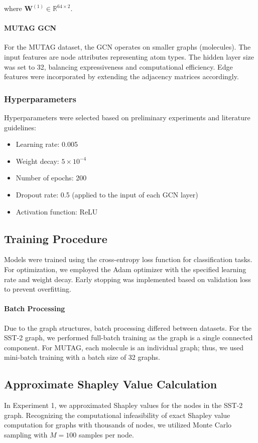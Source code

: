\documentclass{article}
\begin{document}
where $\mathbf{W}^{(1)} \in \mathbb{R}^{64 \times 2}$.

\paragraph{MUTAG GCN}
For the MUTAG dataset, the GCN operates on smaller graphs (molecules). The input features are node attributes representing atom types. The hidden layer size was set to 32, balancing expressiveness and computational efficiency. Edge features were incorporated by extending the adjacency matrices accordingly.

\subsubsection{Hyperparameters}
Hyperparameters were selected based on preliminary experiments and literature guidelines:

\begin{itemize}
    \item Learning rate: 0.005
    \item Weight decay: $5 \times 10^{-4}$
    \item Number of epochs: 200
    \item Dropout rate: 0.5 (applied to the input of each GCN layer)
    \item Activation function: ReLU
\end{itemize}

\subsection{Training Procedure}
Models were trained using the cross-entropy loss function for classification tasks. For optimization, we employed the Adam optimizer with the specified learning rate and weight decay. Early stopping was implemented based on validation loss to prevent overfitting.

\paragraph{Batch Processing}
Due to the graph structures, batch processing differed between datasets. For the SST-2 graph, we performed full-batch training as the graph is a single connected component. For MUTAG, each molecule is an individual graph; thus, we used mini-batch training with a batch size of 32 graphs.

\subsection{Approximate Shapley Value Calculation}
In Experiment 1, we approximated Shapley values for the nodes in the SST-2 graph. Recognizing the computational infeasibility of exact Shapley value computation for graphs with thousands of nodes, we utilized Monte Carlo sampling with $M=100$ samples per node.
\end{document}
